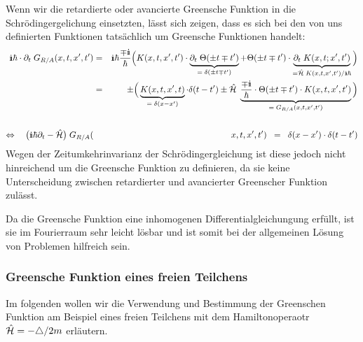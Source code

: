 Wenn wir die retardierte oder avancierte Greensche Funktion in die Schrödingergelichung einsetzten, lässt sich zeigen, dass es sich bei den von uns definierten Funktionen tatsächlich um Greensche Funktionen handelt: 
\begin{eqnarray*}
	\I\hbar\cdot\partial_t\; G_{R/A}(x,t,x',t') &=& \I\hbar \frac{\mp\I}{\hbar}\Big(K(x,t,x',t')\cdot\underbrace{\partial_t\;\Theta(\pm t\mp t')}_{=\;\delta(\pm t\mp t')} + \Theta(\pm t\mp t')\cdot\underbrace{\partial_t\; K(x,t;x',t')}_{= \hat{\ham}\;K(x,t,x',t')/\I\hbar}\Big)
	\\
	&=& \pm\Big(\underbrace{K(x,t,x',t)}_{=\;\delta(x-x')}\cdot\delta(t-t')\pm\hat{\ham}\;\underbrace{\frac{\mp\I}{\hbar}\cdot\Theta(\pm t\mp t')\cdot K(x,t,x',t')}_{=\;G_{R/A}(x,t,x',t')}\Big) 
	\\\;\\
	\Leftrightarrow\quad \big(\I\hbar\partial_t-\hat{\ham}\big)\; G_{R/A}(&&\!\!\!\!\!\!\!\!\!\!\!\!\!\!x,t,x',t') \;\;=\;\; \delta(x-x')\cdot\delta(t-t') 
\end{eqnarray*}
Wegen der Zeitumkehrinvarianz der Schrödingergleichung ist diese jedoch nicht hinreichend um die Greensche Funktion zu definieren, da sie keine Unterscheidung zwischen retardierter und avancierter Greenscher Funktion zulässt. 

Da die Greensche Funktion eine inhomogenen Differentialgleichungung erfüllt, ist sie im Fourierraum sehr leicht lösbar und ist somit bei der allgemeinen Lösung von Problemen hilfreich sein. 


\subsubsection{Greensche Funktion eines freien Teilchens}

Im folgenden wollen wir die Verwendung und Bestimmung der Greenschen Funktion am Beispiel eines freien Teilchens mit dem Hamiltonoperaotr $\hat{\mathcal H}=-\triangle/2m$ erläutern. 

